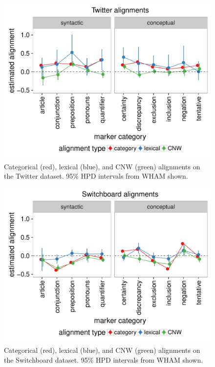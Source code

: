 \documentclass[11pt]{article}
\begin{document}
\begin{figure}[t]
  \begin{center}
    \includegraphics[width=\columnwidth]{results/twitter_line.pdf}
  \end{center}
  \caption{Categorical (red), lexical (blue), and CNW (green) alignments on the Twitter dataset. 95\% HPD intervals from WHAM shown.}\label{fig:twitter-res}
\end{figure}

\begin{figure}[t]
  \begin{center}
    \includegraphics[width=\columnwidth]{results/swbda_line.pdf}
  \end{center}
  \caption{Categorical (red), lexical (blue), and CNW (green) alignments on the Switchboard dataset. 95\% HPD intervals from WHAM shown.}\label{fig:swbda-res}
\end{figure}
\end{document}
